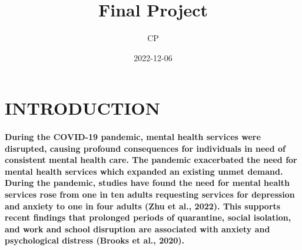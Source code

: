 \documentclass[
  12pt,
]{article}
\title{Final Project}
\author{CP}
\date{2022-12-06}
\begin{document}
\maketitle

\hypertarget{introduction}{%
\section{INTRODUCTION}\label{introduction}}

\hypertarget{during-the-covid-19-pandemic-mental-health-services-were-disrupted-causing-profound-consequences-for-individuals-in-need-of-consistent-mental-health-care.-the-pandemic-exacerbated-the-need-for-mental-health-services-which-expanded-an-existing-unmet-demand.-during-the-pandemic-studies-have-found-the-need-for-mental-health-services-rose-from-one-in-ten-adults-requesting-services-for-depression-and-anxiety-to-one-in-four-adults-zhu-et-al.-2022.-this-supports-recent-findings-that-prolonged-periods-of-quarantine-social-isolation-and-work-and-school-disruption-are-associated-with-anxiety-and-psychological-distress-brooks-et-al.-2020.}{%
\paragraph{During the COVID-19 pandemic, mental health services were
disrupted, causing profound consequences for individuals in need of
consistent mental health care. The pandemic exacerbated the need for
mental health services which expanded an existing unmet demand. During
the pandemic, studies have found the need for mental health services
rose from one in ten adults requesting services for depression and
anxiety to one in four adults (Zhu et al., 2022). This supports recent
findings that prolonged periods of quarantine, social isolation, and
work and school disruption are associated with anxiety and psychological
distress (Brooks et al.,
2020).}\label{during-the-covid-19-pandemic-mental-health-services-were-disrupted-causing-profound-consequences-for-individuals-in-need-of-consistent-mental-health-care.-the-pandemic-exacerbated-the-need-for-mental-health-services-which-expanded-an-existing-unmet-demand.-during-the-pandemic-studies-have-found-the-need-for-mental-health-services-rose-from-one-in-ten-adults-requesting-services-for-depression-and-anxiety-to-one-in-four-adults-zhu-et-al.-2022.-this-supports-recent-findings-that-prolonged-periods-of-quarantine-social-isolation-and-work-and-school-disruption-are-associated-with-anxiety-and-psychological-distress-brooks-et-al.-2020.}}
\end{document}
